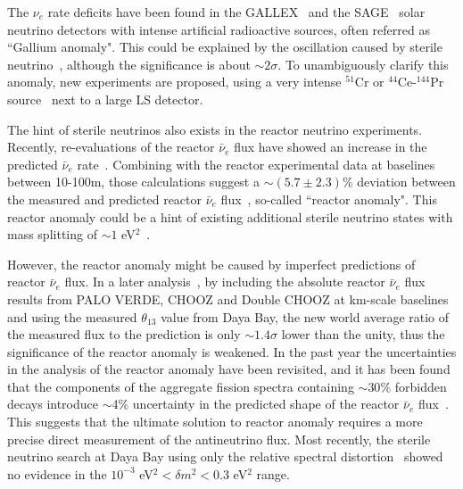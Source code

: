 

The $\nu_e$ rate deficits have been found in the GALLEX~\cite{GALLEX,GALLEX2010} and the SAGE~\cite{SAGE,SAGE2009} solar neutrino detectors with intense artificial radioactive sources, often referred as ``Gallium anomaly". This could be explained by the oscillation caused by sterile neutrino~\cite{Guinti2010}, although the significance is about $\sim2\sigma$. To unambiguously clarify this anomaly, new experiments are proposed, using a very intense $^{51}$Cr or $^{44}$Ce-$^{144}$Pr source~\cite{Cribier2011,Dwyer2013,SOX,CeLAND} next to a large LS detector.


The hint of sterile neutrinos also exists in the reactor neutrino experiments. Recently, re-evaluations of the reactor $\bar\nu_e$ flux have showed an increase in the predicted $\bar\nu_e$ rate~\cite{Mueller2011, Huber2011}. Combining with the reactor experimental data at baselines between 10-100m, those calculations suggest a $\sim(5.7\pm2.3)$\% deviation between the measured and predicted reactor $\bar\nu_e$ flux~\cite{Mention2011}, so-called ``reactor anomaly". This reactor anomaly could be a hint of existing additional sterile neutrino states with mass splitting of $\sim1$ eV$^2$~\cite{Guinti2011}.

However, the reactor anomaly might be caused by imperfect predictions of reactor $\bar\nu_e$ flux. In a later analysis~\cite{Zhang13}, by including the absolute reactor $\bar\nu_e$ flux results from PALO VERDE, CHOOZ and Double CHOOZ at km-scale baselines and using the measured $\theta_{13}$ value from Daya Bay, the new world average ratio of the measured flux to the prediction is only $\sim1.4\sigma$ lower than the unity, thus the significance of the reactor anomaly is weakened. In the past year the uncertainties in the analysis of the reactor anomaly have been revisited, and it has been found that the components of the aggregate fission spectra containing $\sim30\%$ forbidden decays introduce $\sim$4\% uncertainty in the predicted shape of the reactor $\bar\nu_e$ flux~\cite{Hayes}. This suggests that the ultimate solution to reactor anomaly requires a more precise direct measurement of the antineutrino flux. Most recently, the sterile neutrino search at Daya Bay using only the relative spectral distortion~\cite{DayaBaySterile} showed no evidence in the $10^{-3}$ eV$^2<\delta m^2<0.3$ eV$^2$ range.

